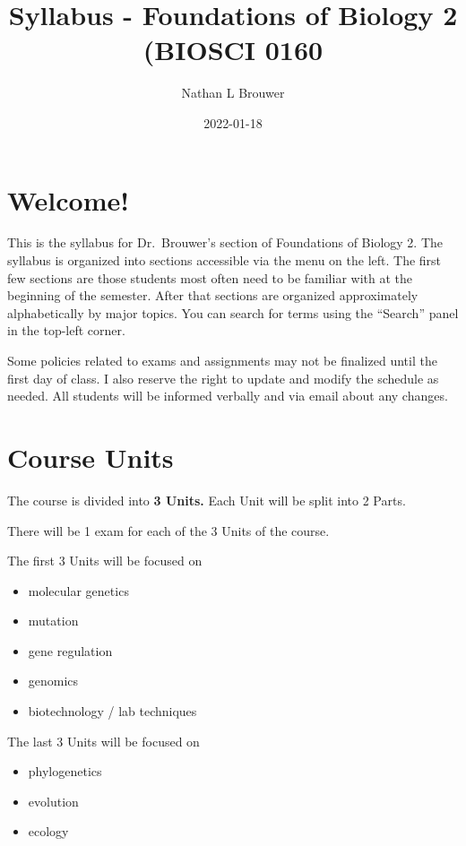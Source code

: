 \documentclass[
]{book}
\title{Syllabus - Foundations of Biology 2 (BIOSCI 0160}
\author{Nathan L Brouwer}
\date{2022-01-18}
\providecommand{\tightlist}{%
  \setlength{\itemsep}{0pt}\setlength{\parskip}{0pt}}
\begin{document}
\maketitle

{
\setcounter{tocdepth}{1}
\tableofcontents
}
\hypertarget{welcome}{%
\chapter{Welcome!}\label{welcome}}

This is the syllabus for Dr.~Brouwer's section of Foundations of Biology 2. The syllabus is organized into sections accessible via the menu on the left. The first few sections are those students most often need to be familiar with at the beginning of the semester. After that sections are organized approximately alphabetically by major topics. You can search for terms using the ``Search'' panel in the top-left corner.

Some policies related to exams and assignments may not be finalized until the first day of class. I also reserve the right to update and modify the schedule as needed. All students will be informed verbally and via email about any changes.

\hypertarget{course-units}{%
\chapter{Course Units}\label{course-units}}

The course is divided into \textbf{3 Units.} Each Unit will be split into 2 Parts.

There will be 1 exam for each of the 3 Units of the course.

The first 3 Units will be focused on

\begin{itemize}
\tightlist
\item
  molecular genetics
\item
  mutation
\item
  gene regulation
\item
  genomics
\item
  biotechnology / lab techniques
\end{itemize}

The last 3 Units will be focused on

\begin{itemize}
\tightlist
\item
  phylogenetics
\item
  evolution
\item
  ecology
\end{itemize}
\end{document}
